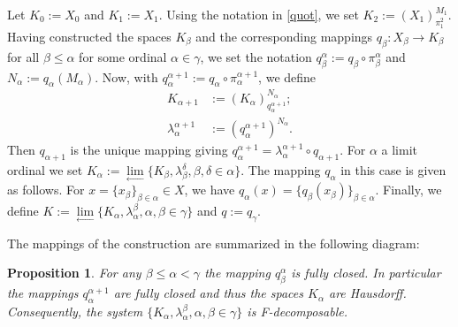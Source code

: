 \documentclass[11pt]{article}
\newtheorem{proposition}[theorem]{Proposition}
\theoremstyle{definition}
\theoremstyle{remark}
\begin{document}
Let $K_0 := X_0$ and $K_1 := X_1$. Using the notation in \ref{quot}, we set $K_2 := (X_1)^{M_1}_{\pi_1^2}$. Having constructed the spaces $K_\beta$ and the corresponding mappings $q_\beta: X_\beta \to K_\beta$ for all $\beta \leq \alpha$ for some ordinal $\alpha \in \gamma$, we set the notation $q^\alpha_\beta := q_\beta \circ \pi^\alpha_\beta$ and $N_\alpha := q_\alpha(M_\alpha)$. Now, with $q^{\alpha + 1}_\alpha := q_\alpha \circ \pi^{\alpha+1}_\alpha$, we define
\begin{align*}
	K_{\alpha + 1} &:= (K_\alpha)^{N_\alpha}_{q^{\alpha + 1}_\alpha};\\
	\lambda_\alpha^{\alpha+1} &:= \left(q^{\alpha+1}_\alpha\right)^{N_\alpha}.
\end{align*}
Then $q_{\alpha + 1}$ is the unique mapping giving $q^{\alpha + 1}_\alpha = \lambda_\alpha^{\alpha + 1} \circ q_{\alpha + 1}$. For $\alpha$ a limit ordinal we set $K_\alpha := \lim\limits_{\leftarrow} \{K_\beta, \lambda^\delta_\beta, \beta, \delta \in \alpha\}$. The mapping $q_\alpha$ in this case is given as follows. For $x = \{x_\beta\}_{\beta \in \alpha} \in X$, we have $q_\alpha(x) = \{q_\beta(x_\beta)\}_{\beta \in \alpha}$. Finally, we define $K := \lim\limits_{\leftarrow} \{K_\alpha, \lambda_\alpha^\beta, \alpha, \beta \in \gamma\}$ and $q := q_\gamma$.

The mappings of the construction are summarized in the following diagram:

\begin{center}
\end{center}

\begin{proposition}\label{constr_well-def}
	For any $\beta \leq \alpha < \gamma$ the mapping $q_\beta^\alpha$ is fully closed. In particular the mappings $q^{\alpha + 1}_\alpha$ are fully closed and thus the spaces $K_\alpha$ are Hausdorff. Consequently, the system $\{K_\alpha, \lambda_\alpha^\beta, \alpha, \beta \in \gamma\}$ is F-decomposable.
\end{proposition}
\end{document}
